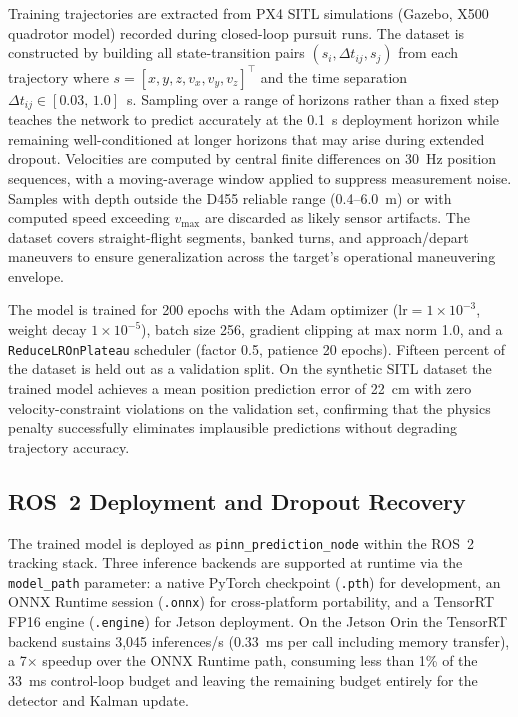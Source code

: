 \documentclass[11pt,letterpaper]{article}
\begin{document}
Training trajectories are extracted from PX4 SITL simulations (Gazebo,
X500 quadrotor model) recorded during closed-loop pursuit runs.
The dataset is constructed by building all state-transition pairs
$(s_i, \Delta t_{ij}, s_j)$ from each trajectory where $s = [x,y,z,
v_x,v_y,v_z]^\top$ and the time separation $\Delta t_{ij} \in
[0.03,\,1.0]$~s.
Sampling over a range of horizons rather than a fixed step teaches the
network to predict accurately at the 0.1~s deployment horizon while
remaining well-conditioned at longer horizons that may arise during
extended dropout.
Velocities are computed by central finite differences on 30~Hz position
sequences, with a moving-average window applied to suppress measurement
noise.
Samples with depth outside the D455 reliable range (0.4--6.0~m) or with
computed speed exceeding $v_{\max}$ are discarded as likely sensor
artifacts.
The dataset covers straight-flight segments, banked turns, and
approach/depart maneuvers to ensure generalization across the target's
operational maneuvering envelope.

The model is trained for 200 epochs with the Adam optimizer
($\mathrm{lr} = 1 \times 10^{-3}$, weight decay $1 \times 10^{-5}$),
batch size 256, gradient clipping at max norm 1.0, and a
\texttt{ReduceLROnPlateau} scheduler (factor 0.5, patience 20 epochs).
Fifteen percent of the dataset is held out as a validation split.
On the synthetic SITL dataset the trained model achieves a mean position
prediction error of 22~cm with zero velocity-constraint violations on
the validation set, confirming that the physics penalty successfully
eliminates implausible predictions without degrading trajectory accuracy.

\subsection{ROS~2 Deployment and Dropout Recovery}
\label{sec:pinn_deploy}

The trained model is deployed as \texttt{pinn\_prediction\_node} within
the ROS~2 tracking stack.
Three inference backends are supported at runtime via the
\texttt{model\_path} parameter: a native PyTorch checkpoint
(\texttt{.pth}) for development, an ONNX Runtime session (\texttt{.onnx})
for cross-platform portability, and a TensorRT FP16 engine
(\texttt{.engine}) for Jetson deployment.
On the Jetson Orin the TensorRT backend sustains 3{,}045 inferences/s
(0.33~ms per call including memory transfer), a 7$\times$ speedup over the ONNX Runtime
path, consuming less than 1\% of the 33~ms control-loop budget and
leaving the remaining budget entirely for the detector and Kalman update.
\end{document}
